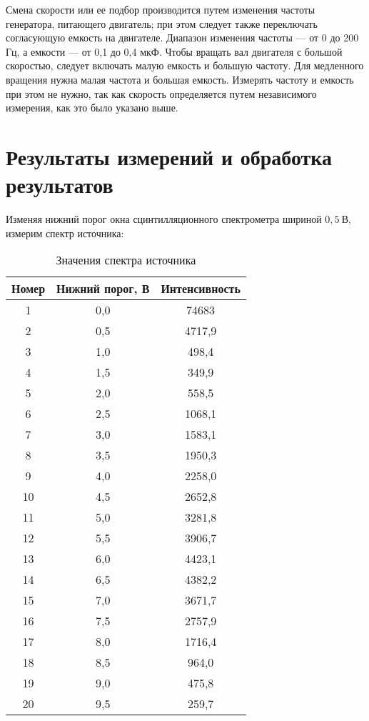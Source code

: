 \documentclass[a4paper, 12pt]{article}
\begin{document}
	Смена скорости или ее подбор производится путем изменения частоты генератора, питающего двигатель; при этом следует также переключать согласующую емкость на двигателе. Диапазон изменения
	частоты --- от 0 до 200 Гц, а емкости --- от 0,1 до 0,4 мкФ. Чтобы вращать вал двигателя с большой скоростью, следует включать малую
	емкость и большую частоту. Для медленного вращения нужна малая
	частота и большая емкость. Измерять частоту и емкость при этом не нужно, так как скорость определяется путем независимого измерения,
	как это было указано выше.






\section{Результаты измерений и обработка результатов}
Изменяя нижний порог окна сцинтилляционного спектрометра шириной
$0,5\: В$, измерим спектр источника:

\renewcommand{\arraystretch}{1.1}

\begin{table}[H]
\centering
\begin{tabular}{|c|c|c|}
\hline
Номер & Нижний порог, В & Интенсивность \\ \hline
1     & 0,0             & 74683         \\ \hline
2     & 0,5             & 4717,9        \\ \hline
3     & 1,0             & 498,4         \\ \hline
4     & 1,5             & 349,9         \\ \hline
5     & 2,0             & 558,5         \\ \hline
6     & 2,5             & 1068,1        \\ \hline
7     & 3,0             & 1583,1        \\ \hline
8     & 3,5             & 1950,3        \\ \hline
9     & 4,0             & 2258,0          \\ \hline
10    & 4,5             & 2652,8        \\ \hline
11    & 5,0             & 3281,8        \\ \hline
12    & 5,5             & 3906,7        \\ \hline
13    & 6,0             & 4423,1        \\ \hline
14    & 6,5             & 4382,2        \\ \hline
15    & 7,0             & 3671,7        \\ \hline
16    & 7,5             & 2757,9        \\ \hline
17    & 8,0             & 1716,4        \\ \hline
18    & 8,5             & 964,0          \\ \hline
19    & 9,0             & 475,8         \\ \hline
20    & 9,5             & 259,7         \\ \hline
\end{tabular}
\caption{Значения спектра источника}
\end{table}
\end{document}
